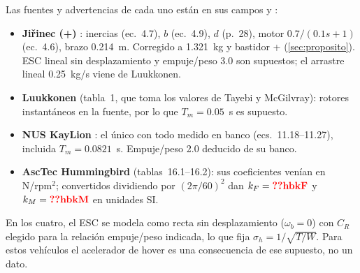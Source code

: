 Las fuentes y advertencias de cada uno están en sus campos  y
:
\begin{itemize}
\item \textbf{Jiřinec (+)} \cite{jirinec11}: inercias (ec.~4.7), $b$ (ec.~4.9),
$d$ (p.~28), motor $0.7/(0.1s+1)$ (ec.~4.6), brazo 0.214~m. Corregido a
1.321~kg y bastidor + (\cref{sec:proposito}). ESC lineal sin
desplazamiento y empuje/peso 3.0 son supuestos; el arrastre lineal
0.25~kg/s viene de Luukkonen.
\item \textbf{Luukkonen} \cite{luukkonen11} (tabla~1, que toma los valores de
Tayebi y McGilvray): rotores instantáneos en la fuente, por lo que
$T_m=0.05$~s es supuesto.
\item \textbf{NUS KayLion} \cite{hb11}: el único con todo medido en banco
(ecs.~11.18--11.27), incluida $T_m=0.0821$~s. Empuje/peso 2.0 deducido de
su banco.
\item \textbf{AscTec Hummingbird} \cite{hb16} (tablas~16.1--16.2): sus
coeficientes venían en N/rpm$^2$; convertidos dividiendo por
$(2\pi/60)^2$ dan $k_F=\val{hbkF}$ y $k_M=\val{hbkM}$ en unidades SI.
\end{itemize}
En los cuatro, el ESC se modela como recta sin desplazamiento
($\omega_b=0$) con $C_R$ elegido para la relación empuje/peso indicada, lo
que fija $\sigma_h=1/\sqrt{T/W}$. Para estos vehículos el acelerador de
hover es una consecuencia de ese supuesto, no un dato.
